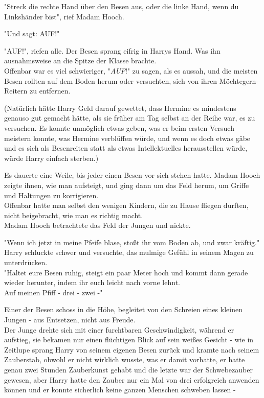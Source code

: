 {"Streck die rechte Hand über den Besen aus, oder die linke Hand, wenn du Linkshänder bist", rief Madam Hooch.

"Und sagt: AUF!"

"AUF!", riefen alle. Der Besen sprang eifrig in Harrys Hand. Was ihn ausnahmsweise an die Spitze der Klasse brachte.\\ Offenbar war es viel schwieriger, "\emph{AUF}!" zu sagen, als es aussah, und die meisten Besen rollten auf dem Boden herum oder versuchten, sich von ihren Möchtegern-Reitern zu entfernen.

(Natürlich hätte Harry Geld darauf gewettet, dass Hermine es mindestens genauso gut gemacht hätte, als sie früher am Tag selbst an der Reihe war, es zu versuchen. Es konnte unmöglich etwas geben, was er beim ersten Versuch meistern konnte, was Hermine verblüffen würde, und wenn es doch etwas gäbe und es sich als Besenreiten statt als etwas Intellektuelles herausstellen würde, würde Harry einfach sterben.)

Es dauerte eine Weile, bis jeder einen Besen vor sich stehen hatte. Madam Hooch zeigte ihnen, wie man aufsteigt, und ging dann um das Feld herum, um Griffe und Haltungen zu korrigieren.\\ Offenbar hatte man selbst den wenigen Kindern, die zu Hause fliegen durften, nicht beigebracht, wie man es richtig macht.\\ Madam Hooch betrachtete das Feld der Jungen und nickte.

"Wenn ich jetzt in meine Pfeife blase, stoßt ihr vom Boden ab, und zwar kräftig."\\ Harry schluckte schwer und versuchte, das mulmige Gefühl in seinem Magen zu unterdrücken.\\ "Haltet eure Besen ruhig, steigt ein paar Meter hoch und kommt dann gerade wieder herunter, indem ihr euch leicht nach vorne lehnt.\\ Auf meinen Pfiff - drei - zwei -"

Einer der Besen schoss in die Höhe, begleitet von den Schreien eines kleinen Jungen - aus Entsetzen, nicht aus Freude.\\ Der Junge drehte sich mit einer furchtbaren Geschwindigkeit, während er aufstieg, sie bekamen nur einen flüchtigen Blick auf sein weißes Gesicht - wie in Zeitlupe sprang Harry von seinem eigenen Besen zurück und kramte nach seinem Zauberstab, obwohl er nicht wirklich wusste, was er damit vorhatte, er hatte genau zwei Stunden Zauberkunst gehabt und die letzte war der Schwebezauber gewesen, aber Harry hatte den Zauber nur ein Mal von drei erfolgreich anwenden können und er konnte sicherlich keine ganzen Menschen schweben lassen -

}
